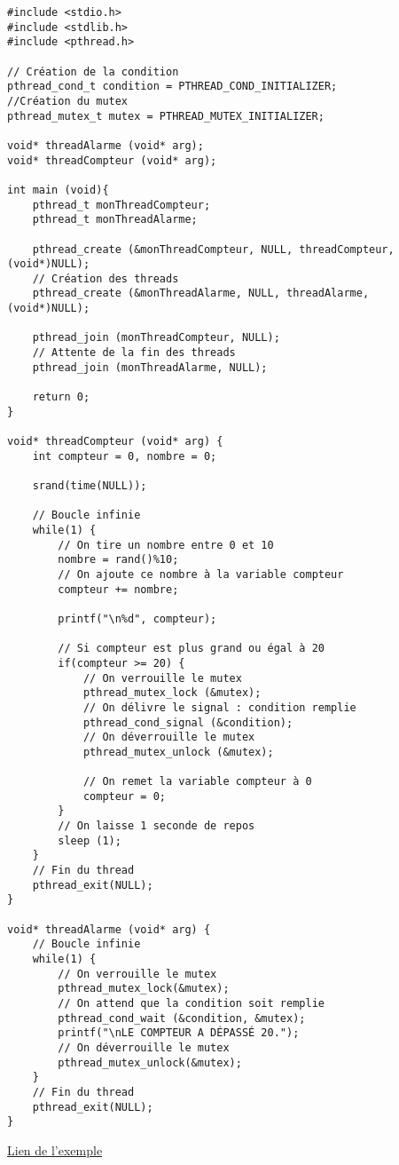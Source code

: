 \documentclass[a4paper]{article}
\begin{document}
\begin{lstlisting}
#include <stdio.h>
#include <stdlib.h>
#include <pthread.h>

// Création de la condition
pthread_cond_t condition = PTHREAD_COND_INITIALIZER;
//Création du mutex
pthread_mutex_t mutex = PTHREAD_MUTEX_INITIALIZER;

void* threadAlarme (void* arg);
void* threadCompteur (void* arg);

int main (void){
	pthread_t monThreadCompteur;
	pthread_t monThreadAlarme;

	pthread_create (&monThreadCompteur, NULL, threadCompteur, (void*)NULL);
    // Création des threads
	pthread_create (&monThreadAlarme, NULL, threadAlarme, (void*)NULL);

	pthread_join (monThreadCompteur, NULL);
    // Attente de la fin des threads
	pthread_join (monThreadAlarme, NULL);

	return 0;
}

void* threadCompteur (void* arg) {
	int compteur = 0, nombre = 0;
	
	srand(time(NULL));

    // Boucle infinie
	while(1) {
        // On tire un nombre entre 0 et 10
		nombre = rand()%10;
        // On ajoute ce nombre à la variable compteur
		compteur += nombre;

		printf("\n%d", compteur);
		
        // Si compteur est plus grand ou égal à 20
		if(compteur >= 20) {
            // On verrouille le mutex
			pthread_mutex_lock (&mutex);
            // On délivre le signal : condition remplie
			pthread_cond_signal (&condition);
            // On déverrouille le mutex
			pthread_mutex_unlock (&mutex);

            // On remet la variable compteur à 0
			compteur = 0;
		}
        // On laisse 1 seconde de repos
		sleep (1);
	}
    // Fin du thread
	pthread_exit(NULL);
}

void* threadAlarme (void* arg) {
    // Boucle infinie
	while(1) {
        // On verrouille le mutex
		pthread_mutex_lock(&mutex);
        // On attend que la condition soit remplie
		pthread_cond_wait (&condition, &mutex);
		printf("\nLE COMPTEUR A DÉPASSÉ 20."); 
        // On déverrouille le mutex
		pthread_mutex_unlock(&mutex);
	}
    // Fin du thread
	pthread_exit(NULL);
}
\end{lstlisting}
\href{https://openclassrooms.com/courses/la-programmation-systeme-en-c-sous-unix/les-threads-3#/id/r-1515355}{Lien de l'exemple}
\end{document}
